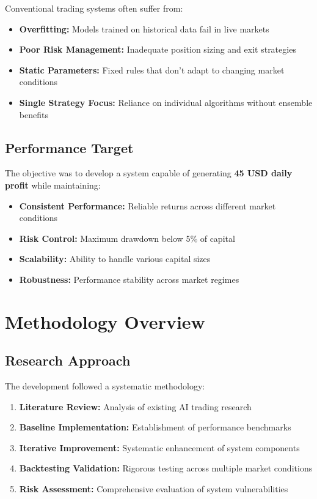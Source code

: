 \documentclass[11pt,a4paper]{article}
\begin{document}
Conventional trading systems often suffer from:

\begin{itemize}
    \item \textbf{Overfitting:} Models trained on historical data fail in live markets
    \item \textbf{Poor Risk Management:} Inadequate position sizing and exit strategies
    \item \textbf{Static Parameters:} Fixed rules that don't adapt to changing market conditions
    \item \textbf{Single Strategy Focus:} Reliance on individual algorithms without ensemble benefits
\end{itemize}

\subsection{Performance Target}

The objective was to develop a system capable of generating \textbf{45 USD daily profit} while maintaining:

\begin{itemize}
    \item \textbf{Consistent Performance:} Reliable returns across different market conditions
    \item \textbf{Risk Control:} Maximum drawdown below 5\% of capital
    \item \textbf{Scalability:} Ability to handle various capital sizes
    \item \textbf{Robustness:} Performance stability across market regimes
\end{itemize}

\section{Methodology Overview}

\subsection{Research Approach}

The development followed a systematic methodology:

\begin{enumerate}
    \item \textbf{Literature Review:} Analysis of existing AI trading research
    \item \textbf{Baseline Implementation:} Establishment of performance benchmarks
    \item \textbf{Iterative Improvement:} Systematic enhancement of system components
    \item \textbf{Backtesting Validation:} Rigorous testing across multiple market conditions
    \item \textbf{Risk Assessment:} Comprehensive evaluation of system vulnerabilities
\end{enumerate}
\end{document}
